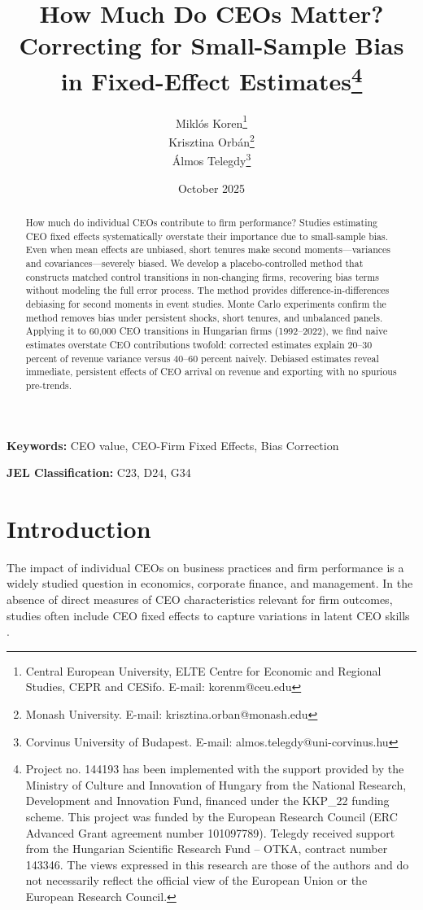 \documentclass[11pt,a4paper]{article}
\title{How Much Do CEOs Matter? Correcting for Small-Sample Bias in Fixed-Effect Estimates\thanks{Project no. 144193 has been implemented with the support provided by the Ministry of Culture and Innovation of Hungary from the National Research, Development and Innovation Fund, financed under the KKP\_22 funding scheme. This project was funded by the European Research Council (ERC Advanced Grant agreement number 101097789). Telegdy received support from the Hungarian Scientific Research Fund – OTKA, contract number 143346. The views expressed in this research are those of the authors and do not necessarily reflect the official view of the European Union or the European Research Council.}}
\author{Miklós Koren\thanks{Central European University, ELTE Centre for Economic and Regional Studies, CEPR and CESifo. E-mail: korenm@ceu.edu} \\
        Krisztina Orbán\thanks{Monash University. E-mail: krisztina.orban@monash.edu} \\
        Álmos Telegdy\thanks{Corvinus University of Budapest. E-mail: almos.telegdy@uni-corvinus.hu}}
\date{October 2025}
\begin{document}
\maketitle
\thispagestyle{empty}

\begin{abstract}
How much do individual CEOs contribute to firm performance? Studies estimating CEO fixed effects systematically overstate their importance due to small-sample bias. Even when mean effects are unbiased, short tenures make second moments---variances and covariances---severely biased. We develop a placebo-controlled method that constructs matched control transitions in non-changing firms, recovering bias terms without modeling the full error process. The method provides difference-in-differences debiasing for second moments in event studies. Monte Carlo experiments confirm the method removes bias under persistent shocks, short tenures, and unbalanced panels. Applying it to 60,000 CEO transitions in Hungarian firms (1992--2022), we find naive estimates overstate CEO contributions twofold: corrected estimates explain 20--30 percent of revenue variance versus 40--60 percent naively. Debiased estimates reveal immediate, persistent effects of CEO arrival on revenue and exporting with no spurious pre-trends.
\end{abstract}

\textbf{Keywords:} CEO value, CEO-Firm Fixed Effects, Bias Correction

\textbf{JEL Classification:} C23, D24, G34

\clearpage
\setcounter{page}{1}

\section{Introduction}

The impact of individual CEOs on business practices and firm performance is a widely studied question in economics, corporate finance, and management. In the absence of direct measures of CEO characteristics relevant for firm outcomes, studies often include CEO fixed effects to capture variations in latent CEO skills \citep{Bertrand2003-io, crossland2011differences, quigley2015has}. 
\end{document}
